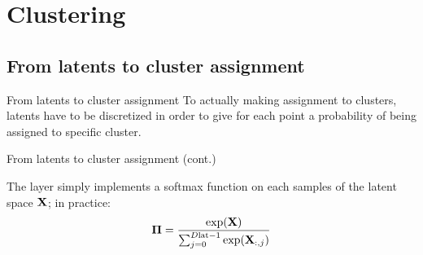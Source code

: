 
\section{Clustering}

\subsection{From latents to cluster assignment}
\begin{frame}{From latents to cluster assignment}
    To actually making assignment to clusters, latents have to be discretized in order to give for each point a probability of being assigned to specific cluster.
    \pause
    
\end{frame}

\begin{frame}{From latents to cluster assignment (cont.)}
    
    \pause
    The \softmax layer simply implements a softmax function on each samples of the latent space $\mathbf{X}$; in practice:
    \begin{equation}
        \boldsymbol{\Pi} = \dfrac{\exp(\mathbf{X})} {\sum_{j=0}^{D\mathrm{lat} - 1} \exp(\mathbf{X}_{:,j})}
    \end{equation}

\end{frame}
